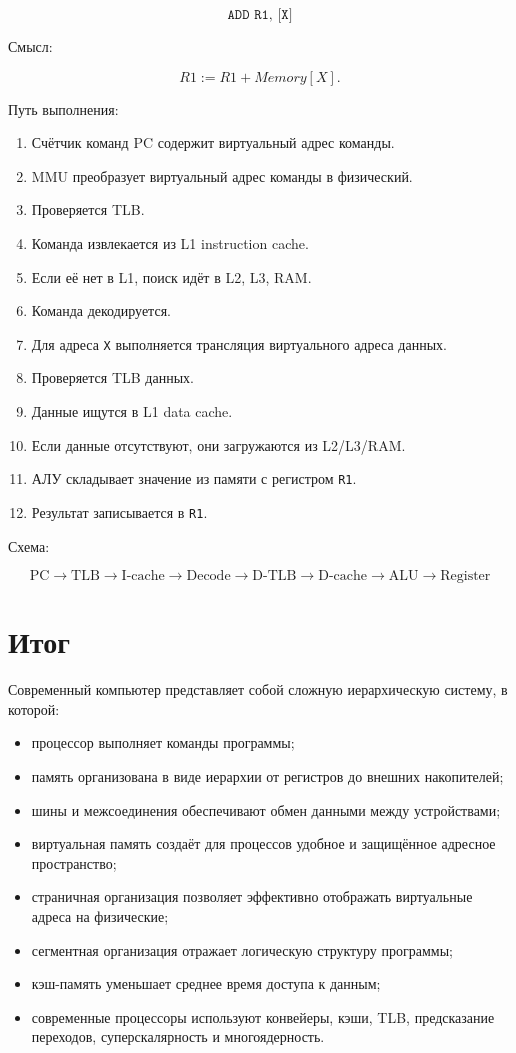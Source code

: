 \documentclass[12pt,a4paper]{article}
\theoremstyle{remark}
\begin{document}
\[
\texttt{ADD R1, [X]}
\]

Смысл:

\[
R1 := R1 + Memory[X].
\]

Путь выполнения:

\begin{enumerate}
    \item Счётчик команд PC содержит виртуальный адрес команды.
    \item MMU преобразует виртуальный адрес команды в физический.
    \item Проверяется TLB.
    \item Команда извлекается из L1 instruction cache.
    \item Если её нет в L1, поиск идёт в L2, L3, RAM.
    \item Команда декодируется.
    \item Для адреса \texttt{X} выполняется трансляция виртуального адреса данных.
    \item Проверяется TLB данных.
    \item Данные ищутся в L1 data cache.
    \item Если данные отсутствуют, они загружаются из L2/L3/RAM.
    \item АЛУ складывает значение из памяти с регистром \texttt{R1}.
    \item Результат записывается в \texttt{R1}.
\end{enumerate}

Схема:

\[
\boxed{\text{PC}}
\rightarrow
\boxed{\text{TLB}}
\rightarrow
\boxed{\text{I-cache}}
\rightarrow
\boxed{\text{Decode}}
\rightarrow
\boxed{\text{D-TLB}}
\rightarrow
\boxed{\text{D-cache}}
\rightarrow
\boxed{\text{ALU}}
\rightarrow
\boxed{\text{Register}}
\]

\section{Итог}

Современный компьютер представляет собой сложную иерархическую систему, в которой:
\begin{itemize}
    \item процессор выполняет команды программы;
    \item память организована в виде иерархии от регистров до внешних накопителей;
    \item шины и межсоединения обеспечивают обмен данными между устройствами;
    \item виртуальная память создаёт для процессов удобное и защищённое адресное пространство;
    \item страничная организация позволяет эффективно отображать виртуальные адреса на физические;
    \item сегментная организация отражает логическую структуру программы;
    \item кэш-память уменьшает среднее время доступа к данным;
    \item современные процессоры используют конвейеры, кэши, TLB, предсказание переходов, суперскалярность и многоядерность.
\end{itemize}
\end{document}
